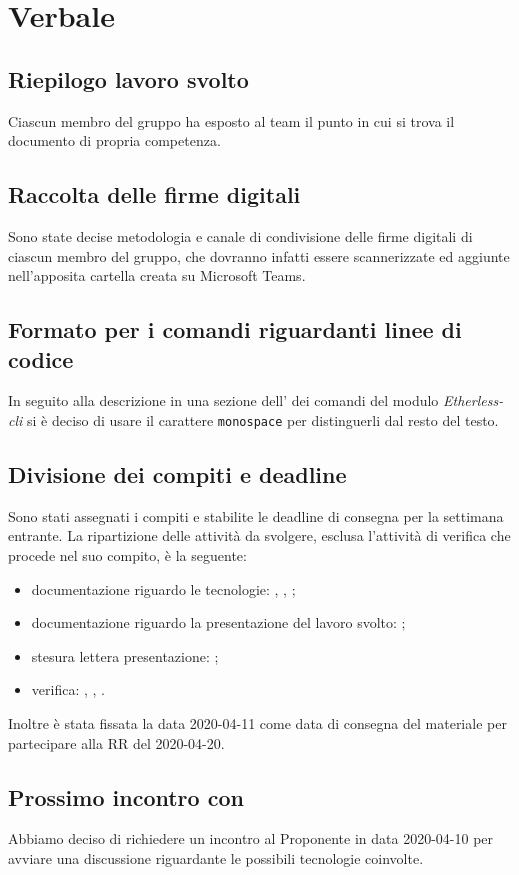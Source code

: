 \section{Verbale}
	
	\subsection{Riepilogo lavoro svolto}
		Ciascun membro del gruppo ha esposto al team il punto in cui si trova il documento di propria competenza.

	\subsection{Raccolta delle firme digitali}
		Sono state decise metodologia e canale di condivisione delle firme digitali di ciascun membro del gruppo, che dovranno infatti essere scannerizzate ed aggiunte nell'apposita cartella creata su Microsoft Teams.
		
	\subsection{Formato per i comandi riguardanti linee di codice}
		In seguito alla descrizione in una sezione dell'\AdR{} dei comandi del modulo \textit{Etherless-cli} si è deciso di usare il carattere \texttt{monospace} per distinguerli dal resto del testo.
				
	\subsection{Divisione dei compiti e deadline}
		Sono stati assegnati i compiti e stabilite le deadline di consegna per la settimana entrante. La ripartizione delle attività da svolgere, esclusa l'attività di verifica che procede nel suo compito, è la seguente:
		\begin{itemize}
			\item{documentazione riguardo le tecnologie: \EG, \AS, \FJ;}
			\item{documentazione riguardo la presentazione del lavoro svolto: \NF;}
			\item{stesura lettera presentazione: \VB;}
			\item{verifica: \LB, \MP, \AZ.}
		\end{itemize}
		Inoltre è stata fissata la data 2020-04-11 come data di consegna del materiale per partecipare alla RR del 2020-04-20.

	\subsection{Prossimo incontro con \Proponente{}}
	    Abbiamo deciso di richiedere un incontro al Proponente in data 2020-04-10 per avviare una discussione riguardante le possibili tecnologie coinvolte. 

